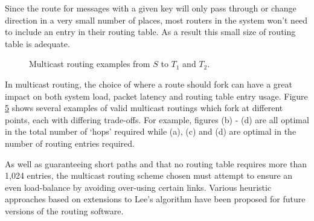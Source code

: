 				Since the route for messages with a given key will only pass through or
				change direction in a very small number of places, most routers in the
				system won't need to include an entry in their routing table. As a
				result this small size of routing table is adequate.
				
				\begin{figure}
					\begin{subfigure}[b]{0.24\textwidth}
						\center
						
						\caption{}
						\label{fig:multicast-routing-a}
					\end{subfigure}
					\begin{subfigure}[b]{0.24\textwidth}
						\center
						
						\caption{}
						\label{fig:multicast-routing-b}
					\end{subfigure}
					\begin{subfigure}[b]{0.24\textwidth}
						\center
						
						\caption{}
						\label{fig:multicast-routing-c}
					\end{subfigure}
					\begin{subfigure}[b]{0.24\textwidth}
						\center
						
						\caption{}
						\label{fig:multicast-routing-d}
					\end{subfigure}
					\caption[Multicast routing examples.]{Multicast routing examples from
					$S$ to $T_1$ and $T_2$.}
					\label{fig:multicast-routing}
				\end{figure}
				
				In multicast routing, the choice of where a route should fork can have a
				great impact on both system load, packet latency and routing table entry
				usage. Figure \ref{fig:multicast-routing} shows several examples of
				valid multicast routings which fork at different points, each with
				differing trade-offs. For example, figures (b) - (d) are all optimal in the total
				number of `hops' required while (a), (c) and (d) are optimal in the
				number of routing entries required.
				
				As well as guaranteeing short paths and that no routing table requires
				more than 1,024 entries, the multicast routing scheme chosen must
				attempt to ensure an even load-balance by avoiding over-using certain
				links. Various heuristic approaches based on extensions to Lee's
				algorithm have been proposed for future versions of the routing
				software\cite{davidson13}.
			
